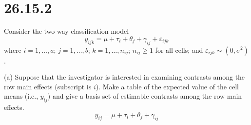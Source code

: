 \section*{26.15.2}
Consider the two-way classification model
\[
y_{ijk}=\mu+\tau_i+\theta_j+\gamma_{ij}+\varepsilon_{ijk}
\]
where $i=1,\ldots,a$; $j=1,\ldots,b$;
$k=1,\ldots,n_{ij}$; $n_{ij}\ge1$ for all cells; and
$\varepsilon_{ijk}\sim(0,\sigma^2)$.

\bigskip
\noindent
(a) Suppose that the investigator is interested in examining contrasts
among the row main effects (subscript is $i$).
Make a table of the expected value of the cell means
(i.e., $\overline{y}_{ij}$) and give a basis set of
estimable contrasts among the row main effects.
\[
\overline{y}_{ij}=\mu+\tau_i+\theta_j+\gamma_{ij}
\]
